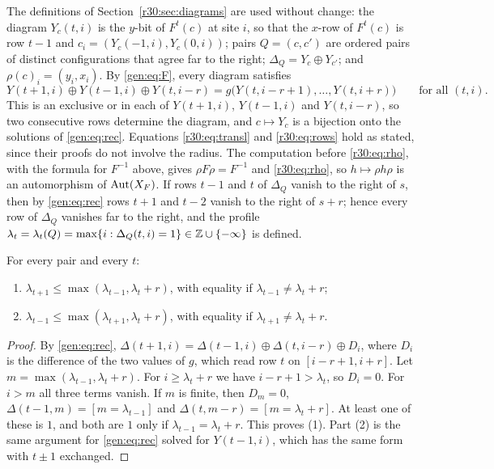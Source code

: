 The definitions of Section~\ref{r30:sec:diagrams} are used without change: the diagram $Y_c(t,i)$ is the $y$-bit of $F^t(c)$ at site $i$, so that the $x$-row of $F^t(c)$ is row $t-1$ and $c_i=(Y_c(-1,i),Y_c(0,i))$; pairs $Q=(c,c')$ are ordered pairs of distinct configurations that agree far to the right; $\Delta_Q=Y_c\oplus Y_{c'}$; and $\rho(c)_i=(y_i,x_i)$. By \eqref{gen:eq:F}, every diagram satisfies
\begin{equation}\label{gen:eq:rec}
Y(t+1,i)\oplus Y(t-1,i)\oplus Y(t,i-r)=g\bigl(Y(t,i-r+1),\dots,Y(t,i+r)\bigr)\qquad\text{for all }(t,i).
\end{equation}
This is an exclusive or in each of $Y(t+1,i)$, $Y(t-1,i)$ and $Y(t,i-r)$, so two consecutive rows determine the diagram, and $c\mapsto Y_c$ is a bijection onto the solutions of \eqref{gen:eq:rec}. Equations \eqref{r30:eq:transl} and \eqref{r30:eq:rows} hold as stated, since their proofs do not involve the radius. The computation before \eqref{r30:eq:rho}, with the formula for $F^{-1}$ above, gives $\rho F\rho=F^{-1}$ and \eqref{r30:eq:rho}, so $h\mapsto\rho h\rho$ is an automorphism of $\operatorname{Aut}(X_F)$. If rows $t-1$ and $t$ of $\Delta_Q$ vanish to the right of $s$, then by \eqref{gen:eq:rec} rows $t+1$ and $t-2$ vanish to the right of $s+r$; hence every row of $\Delta_Q$ vanishes far to the right, and the profile $\lambda_t=\lambda_t(Q)=\max\{i:\Delta_Q(t,i)=1\}\in\mathbb{Z}\cup\{-\infty\}$ is defined.

\begin{lemma}\label{gen:lem:R}
For every pair and every $t$:
\begin{enumerate}
\item $\lambda_{t+1}\le\max(\lambda_{t-1},\lambda_t+r)$, with equality if $\lambda_{t-1}\ne\lambda_t+r$;
\item $\lambda_{t-1}\le\max(\lambda_{t+1},\lambda_t+r)$, with equality if $\lambda_{t+1}\ne\lambda_t+r$.
\end{enumerate}
\end{lemma}

\begin{proof}
By \eqref{gen:eq:rec}, $\Delta(t+1,i)=\Delta(t-1,i)\oplus\Delta(t,i-r)\oplus D_i$, where $D_i$ is the difference of the two values of $g$, which read row $t$ on $[i-r+1,i+r]$. Let $m=\max(\lambda_{t-1},\lambda_t+r)$. For $i\ge\lambda_t+r$ we have $i-r+1>\lambda_t$, so $D_i=0$. For $i>m$ all three terms vanish. If $m$ is finite, then $D_m=0$, $\Delta(t-1,m)=[m=\lambda_{t-1}]$ and $\Delta(t,m-r)=[m=\lambda_t+r]$. At least one of these is $1$, and both are $1$ only if $\lambda_{t-1}=\lambda_t+r$. This proves (1). Part (2) is the same argument for \eqref{gen:eq:rec} solved for $Y(t-1,i)$, which has the same form with $t\pm1$ exchanged.
\end{proof}

